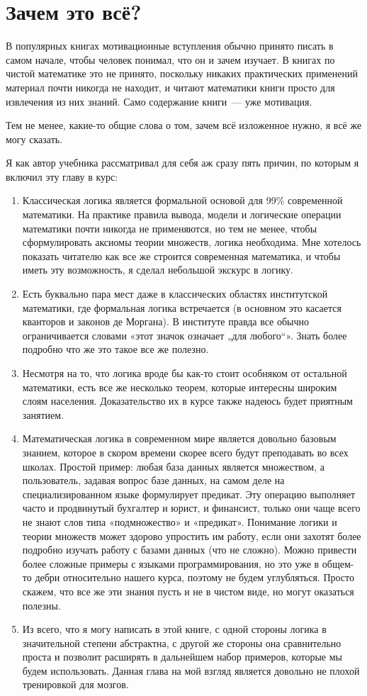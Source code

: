 \section{Зачем это всё?}

В популярных книгах мотивационные вступления обычно принято писать в самом начале, чтобы человек понимал, что он и зачем изучает. В книгах по чистой математике это не принято, поскольку никаких практических применений материал почти никогда не находит, и читают математики книги просто для извлечения из них знаний. Само содержание книги~--- уже мотивация.

Тем не менее, какие-то общие слова о том, зачем всё изложенное нужно, я всё же могу сказать.

Я как автор учебника рассматривал для себя аж сразу пять причин, по которым я включил эту главу в курс:

\begin{enumerate}
\item Классическая логика является формальной основой для 99\% современной математики. На практике правила вывода, модели и логические операции математики почти никогда не применяются, но тем не менее, чтобы сформулировать аксиомы теории множеств, логика необходима. Мне хотелось показать читателю как все же строится современная математика, и чтобы иметь эту возможность, я сделал небольшой экскурс в логику.
\item Есть буквально пара мест даже в классических областях институтской математики, где формальная логика встречается (в основном это касается кванторов и законов де Моргана). В институте правда все обычно ограничивается словами «этот значок означает „для любого“». Знать более подробно что же это такое все же полезно.
\item Несмотря на то, что логика вроде бы как-то стоит особняком от остальной математики, есть все же несколько теорем, которые интересны широким слоям населения. Доказательство их в курсе также надеюсь будет приятным занятием.
\item Математическая логика в современном мире является довольно базовым знанием, которое в скором времени скорее всего будут преподавать во всех школах. Простой пример: любая база данных является множеством, а пользователь, задавая вопрос базе данных, на самом деле на специализированном языке формулирует предикат. Эту операцию выполняет часто и продвинутый бухгалтер и юрист, и финансист, только они чаще всего не знают слов типа «подмножество» и «предикат». Понимание логики и теории множеств может здорово упростить им работу, если они захотят более подробно изучать работу с базами данных (что не сложно). Можно привести более сложные примеры с языками программирования, но это уже в общем-то дебри относительно нашего курса, поэтому не будем углубляться. Просто скажем, что все же эти знания пусть и не в чистом виде, но могут оказаться полезны.
\item Из всего, что я могу написать в этой книге, с одной стороны логика в значительной степени абстрактна, с другой же стороны она сравнительно проста и позволит расширять в дальнейшем набор примеров, которые мы будем использовать. Данная глава на мой взгляд является довольно не плохой тренировкой для мозгов.
\end{enumerate}

